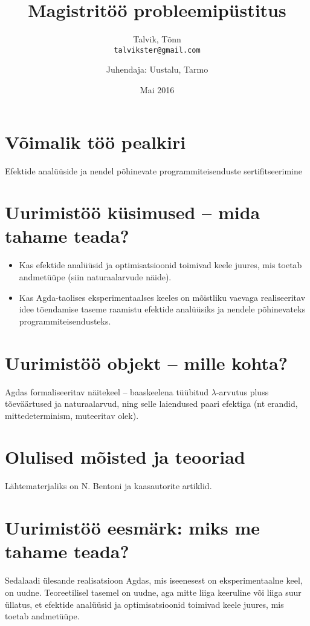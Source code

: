 \documentclass[a4paper]{article}
\begin{document}
\title{Magistritöö probleemipüstitus}
\author{
  Talvik, Tõnn\\
  \texttt{talvikster@gmail.com}
  \and
  Juhendaja: Uustalu, Tarmo
}
\date{Mai 2016}
\maketitle

\section{Võimalik töö pealkiri}
Efektide analüüside ja nendel põhinevate programmiteisenduste sertifitseerimine

\section{Uurimistöö küsimused -- mida tahame teada?}

\begin{itemize}
\item Kas efektide analüüsid ja optimisatsioonid toimivad keele juures, mis toetab andmetüüpe (siin naturaalarvude näide).
\item Kas Agda-taolises eksperimentaalses keeles on mõistliku vaevaga realiseeritav idee tõendamise taseme raamistu efektide analüüsiks ja nendele põhinevateks programmiteisendusteks.
\end{itemize}


\section{Uurimistöö objekt -- mille kohta?}

Agdas formaliseeritav näitekeel -- baaskeelena tüübitud $\lambda$-arvutus pluss tõeväärtused ja naturaalarvud, ning selle laiendused paari efektiga (nt erandid, mittedeterminism, muteeritav olek).

\section{Olulised mõisted ja teooriad}
Lähtematerjaliks on N. Bentoni ja kaasautorite artiklid.

\section{Uurimistöö eesmärk: miks me tahame teada?}
Sedalaadi ülesande realisatsioon Agdas, mis iseenesest on eksperimentaalne keel, on uudne. Teoreetilisel tasemel on uudne, aga mitte liiga keeruline või liiga suur üllatus, et efektide analüüsid ja optimisatsioonid toimivad keele juures, mis toetab andmetüüpe.
\end{document}
